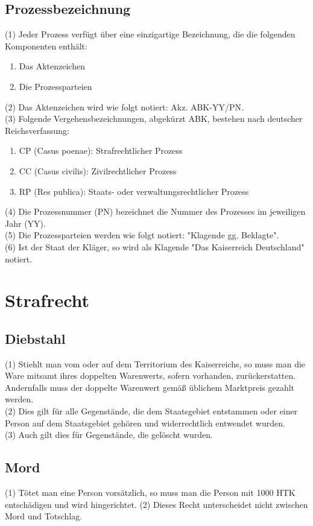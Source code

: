 \documentclass{article}
\begin{document}
\subsection{Prozessbezeichnung}
(1) Jeder Prozess verfügt über eine einzigartige Bezeichnung, die die folgenden Komponenten enthält:
\begin{enumerate}
	\item Das Aktenzeichen
	\item Die Prozessparteien
\end{enumerate}
(2) Das Aktenzeichen wird wie folgt notiert: Akz. ABK-YY/PN.\\
(3) Folgende Vergehensbezeichnungen, abgekürzt ABK, bestehen nach deutscher Reichsverfassung:
\begin{enumerate}
	\item CP (Casus poenae): Strafrechtlicher Prozess
	\item CC (Casus civilis): Zivilrechtlicher Prozess
	\item RP (Res publica): Staats- oder verwaltungsrechtlicher Prozess
\end{enumerate}
(4) Die Prozessnummer (PN) bezeichnet die Nummer des Prozesses im jeweiligen Jahr (YY).\\
(5) Die Prozessparteien werden wie folgt notiert: "Klagende gg. Beklagte".\\
(6) Ist der Staat der Kläger, so wird als Klagende "Das Kaiserreich Deutschland" notiert.

\section{Strafrecht}
\subsection{Diebstahl}
(1) Stiehlt man vom oder auf dem Territorium des Kaiserreichs, so muss man die Ware mitsamt ihres doppelten Warenwerts, sofern vorhanden, zurückerstatten. Andernfalls muss der doppelte Warenwert gemäß üblichem Marktpreis gezahlt werden.\\
(2) Dies gilt für alle Gegenstände, die dem Staatsgebiet entstammen oder einer Person auf dem Staatsgebiet gehören und widerrechtlich entwendet wurden.\\
(3) Auch gilt dies für Gegenstände, die gelöscht wurden.

\subsection{Mord}
(1) Tötet man eine Person vorsätzlich, so muss man die Person mit 1000 HTK entschädigen und wird hingerichtet.
(2) Dieses Recht unterscheidet nicht zwischen Mord und Totschlag.
\end{document}

